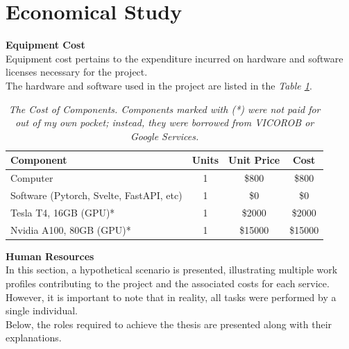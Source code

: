 \section{Economical Study}

\vspace{0.5cm}
\textbf{Equipment Cost} \\

Equipment cost pertains to the expenditure incurred on hardware and software licenses necessary for the project. \\

The hardware and software used in the project are listed in the \textit{Table \ref{table:equipment_cost}}.

\begin{table}[H]
\centering
\begin{tabular}{lccc}
	 \toprule
    \textbf{Component} & \textbf{Units} & \textbf{Unit Price} & \textbf{Cost} \\
		\midrule
    Computer & 1 & \$800 & \$800 \\
    Software (Pytorch, Svelte, FastAPI, etc) & 1 & \$0 & \$0 \\
    Tesla T4, 16GB (GPU)* & 1 & \$2000 & \$2000 \\
    Nvidia A100, 80GB (GPU)* & 1 & \$15000 & \$15000 \\
		\bottomrule
\end{tabular}
\caption[The Cost of Components.]{\textit{The Cost of Components. Components marked with (*) were not paid for out of my own pocket; instead, they were borrowed from VICOROB or Google Services.}}
{\label{table:equipment_cost}}
\end{table}

\vspace{0.5cm}
\textbf{Human Resources} \\

In this section, a hypothetical scenario is presented, illustrating multiple work profiles contributing to the project and the associated costs for each service. However, it is important to note that in reality, all tasks were performed by a single individual. \\

Below, the roles required to achieve the thesis are presented along with their explanations. \\

